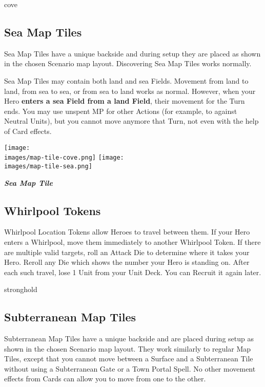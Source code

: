 \begin{multicols*}{2}
\begin{expansion}{cove}
\subsection*{Sea Map Tiles}
Sea Map Tiles have a unique backside and during setup they are placed as shown in the chosen Scenario map layout.
Discovering Sea Map Tiles works normally.\par
Sea Map Tiles may contain both land and sea Fields.
Movement from land to land, from sea to sea, or from sea to land works as normal.
However, when your Hero \textbf{enters a sea Field from a land Field}, their movement for the Turn ends.
You may use unspent MP for other Actions (for example, to  against Neutral Units), but you cannot move anymore that Turn, not even with the help of Card effects.

\bigskip
\begin{multicols*}{2}
\hspace{-0.5em}\texttt{[image: \\images/map-tile-cove.png]}
\columnbreak
\hspace{-0.5em}\texttt{[image: \\images/map-tile-sea.png]}
\end{multicols*}
\medskip
\begin{center}
  \footnotesize{\textbf{\textit{\textcolor{darkcandyapplered}{Sea Map Tile}}}}
\end{center}
\medskip

\subsection*{Whirlpool Tokens}
Whirlpool Location Tokens allow Heroes to travel between them.
If your Hero enters a Whirlpool, move them immediately to another Whirlpool Token.
If there are multiple valid targets, roll an Attack Die to determine where it takes your Hero.
Reroll any Die which shows the number your Hero is standing on.
After each such travel, lose 1 Unit from your Unit Deck.
You can Recruit it again later.
\end{expansion}

\begin{expansion}{stronghold}
\subsection*{Subterranean Map Tiles}
Subterranean Map Tiles have a unique backside and are placed during setup as shown in the chosen Scenario map layout.
They work similarly to regular Map Tiles, except that you cannot move between a Surface and a Subterranean Tile without using a Subterranean Gate or a Town Portal Spell.
No other movement effects from Cards can allow you to move from one to the other.


\end{expansion}
\end{multicols*}
